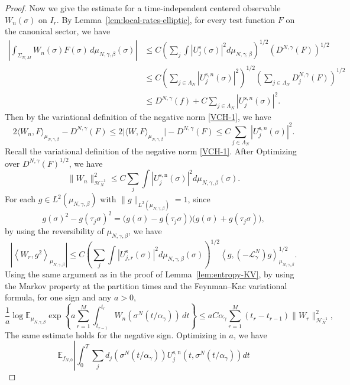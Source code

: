 \documentclass{article}
\begin{document}
\begin{proof}
Now we give the estimate for a time-independent centered observable $W_n(\sigma)$ on $I_r$.
By Lemma~\ref{lem:local-rates-elliptic}, for every test function \(F\) on the canonical sector, we have
\begin{align*}
\left| \int_{\Sigma_{N,M}} W_n(\sigma)F(\sigma)\,d\mu_{N,\gamma,\beta}(\sigma) \right| & \le C
\left(\sum_j\int |U_j^{\mathrm s}(\sigma)|^2d\mu_{N,\gamma,\beta}\right)^{1/2}
\left(D^{N,\gamma}(F)\right)^{1/2}\\
&\le  C \left( \sum_{j\in\Lambda_N} |U_j^{\mathrm s,n }(\sigma)|^2\right)^{1/2} 
\left( \sum_{j\in\Lambda_N} D^{N,\gamma}_{j}(F) \right)^{1/2} \\
&\le   D^{N,\gamma}(f) + C \sum_{j\in\Lambda_N} |U_j^{\mathrm s,n }(\sigma)|^2.
\end{align*}
Then by the variational definition of the negative norm \eqref{VCH-1}, we have
\[
  2\langle W_n,F\rangle_{\mu_{N,\gamma,\beta}}-D^{N,\gamma}(F) \le 2\bigl| \langle W,F\rangle_{\mu_{N,\gamma,\beta}} \bigr|-  D^{N,\gamma}(F) \le C\sum_{j\in\Lambda_N} |U_j^{\mathrm s,n }(\sigma)|^2.
\]
Recall the variational definition of the negative norm
\eqref{VCH-1}. After Optimizing over \(D^{N,\gamma}(F)^{1/2}\), we have
\begin{equation*}
    \|W_n\|_{\mathcal H_N^{-1}}^2
\le C\sum_j\int |U_j^{\mathrm{s,n}}(\sigma)|^2d\mu_{N,\gamma,\beta}(\sigma).
\end{equation*}
For each \(g \in L^2(\mu_{N,\gamma,\beta})\) with $\|g\|_{L^2(\mu_{N,\gamma,\beta})}=1$, since
\[
g(\sigma)^2-g(\tau_j\sigma)^2
=
\bigl(g(\sigma)-g(\tau_j\sigma)\bigr)
\bigl(g(\sigma)+g(\tau_j\sigma)\bigr),
\]
by using the reversibility of $\mu_{N,\gamma,\beta}$, we have
\[
\left|
\left\langle W_r,g^2\right\rangle_{\mu_{N,\gamma,\beta}}
\right|
\le
C
\left(\sum_j\int |U_{j,r}^{\mathrm s}(\sigma)|^2
d\mu_{N,\gamma,\beta}(\sigma)\right)^{1/2}
\left\langle g,(-\mathscr L_\gamma^N)g
\right\rangle_{\mu_{N,\gamma,\beta}}^{1/2}.
\]
Using the same argument as in the proof of Lemma~\ref{lem:entropy-KV}, by using the Markov property at the partition times and the Feynman--Kac variational formula, for one sign and any \(a>0\),
\[
\frac1a\log
\mathbb E_{\mu_{N,\gamma,\beta}}
\exp\left\{
a\sum_{r=1}^M
\int_{t_{r-1}}^{t_r}
W_n(\sigma^N(t/\alpha_\gamma))\,dt
\right\} \le aC \alpha_\gamma
\sum_{r=1}^M(t_r-t_{r-1})\|W_r\|_{\mathcal H_N^{-1}}^2,
\]
The same estimate holds for the negative sign.
Optimizing in \(a\), we have
\[
\mathbb{E}_{f_{N,0}} \left|
\int_0^T\sum_jd_j(\sigma^N(t/\alpha_\gamma))U_j^{\mathrm{s,n}}(t,\sigma^N(t/\alpha_\gamma))dt
\]
\end{proof}
\end{document}
